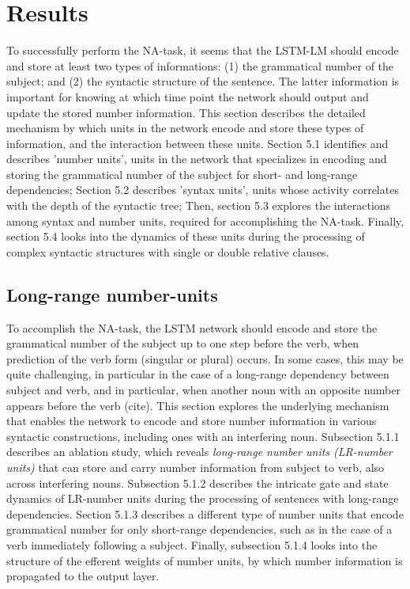 \section{Results}
To successfully perform the NA-task, it seems that the LSTM-LM should encode and store at least two types of informations: (1) the grammatical number of the subject; and (2) the syntactic structure of the sentence. The latter information is important for knowing at which time point the network should output and update the stored number information. This section describes the detailed mechanism by which units in the network encode and store these types of information, and the interaction between these units. Section 5.1 identifies and describes 'number units', units in the network that specializes in encoding and storing the grammatical number of the subject for short- and long-range dependencies; Section 5.2 describes 'syntax units', units whose activity correlates with the depth of the syntactic tree; Then, section 5.3 explores the interactions among syntax and number units, required for accomplishing the NA-task. Finally, section 5.4 looks into the dynamics of these units during the processing of complex syntactic structures with single or double relative clauses.

\subsection{Long-range number-units}
To accomplish the NA-task, the LSTM network should encode and store the grammatical number of the subject up to one step before the verb, when prediction of the verb form (singular or plural) occurs. In some cases, this may be quite challenging, in particular in the case of a long-range dependency between subject and verb, and in particular, when another noun with an opposite number appears before the verb (cite). This section explores the underlying mechanism that enables the network to encode and store number information in various syntactic constructions, including ones with an interfering noun. Subsection 5.1.1 describes an ablation study, which reveals \textit{long-range number units (LR-number units)} that can store and carry number information from subject to verb, also across interfering nouns. Subsection 5.1.2 describes the intricate gate and state dynamics of LR-number units during the processing of sentences with long-range dependencies. Section 5.1.3 describes a different type of number units that encode grammatical number for only short-range dependencies, such as in the case of a verb immediately following a subject. Finally, subsection 5.1.4 looks into the structure of the efferent weights of number units, by which number information is propagated to the output layer.

